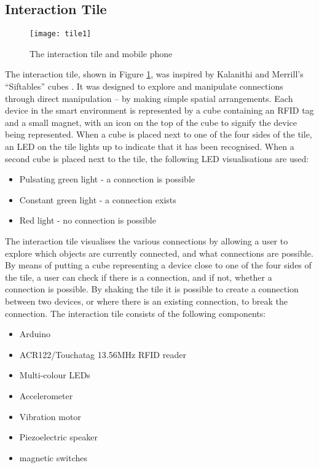 

\subsection{Interaction Tile}
\label{InteractionTile}

\begin{figure}[bth]
\centering
\texttt{[image: tile1]}
\caption{The interaction tile and mobile phone}
\label{tile1}
\end{figure}

The interaction tile, shown in Figure \ref{tile1}, was inspired by Kalanithi and Merrill's ``Siftables'' cubes \cite{Merrill2007}. It was designed to explore and manipulate connections through direct manipulation -- by making simple spatial arrangements. Each device in the smart environment is represented by a cube containing an \ac{RFID} tag and a small magnet, with an icon on the top of the cube to signify the device being represented. When a cube is placed next to one of the four sides of the tile, an LED on the tile lights up to indicate that it has been recognised. When a second cube is placed next to the tile, the following LED visualisations are used:

\begin{itemize}
	\item Pulsating green light - a connection is possible
	\item Constant green light - a connection exists
	\item Red light - no connection is possible
\end{itemize}  

The interaction tile visualises the various connections by allowing a user to explore which objects are currently connected, and what connections are possible. By means of putting a cube representing a device close to one of the four sides of the tile, a user can check if there is a connection, and if not, whether a connection is possible. By shaking the tile it is possible to create a connection between two devices, or where there is an existing connection, to break the connection. The interaction tile consists of the following components:

\begin{itemize}
	\item Arduino 
	\item ACR122/Touchatag 13.56MHz \ac{RFID} reader
	\item Multi-colour LEDs
	\item Accelerometer
	\item Vibration motor
	\item Piezoelectric speaker
	\item magnetic switches
\end{itemize}

